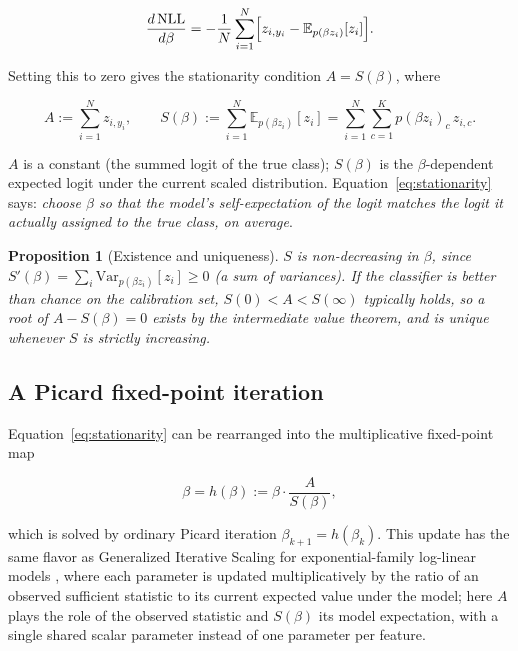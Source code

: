 \documentclass[11pt]{article}
\newtheorem{proposition}{Proposition}
\begin{document}
\begin{equation}
  \frac{d\,\mathrm{NLL}}{d\beta} = -\frac{1}{N}\sum_{i=1}^N
  \Bigl[z_{i,y_i} - \mathbb{E}_{p(\beta z_i)}[z_i]\Bigr].
\end{equation}

Setting this to zero gives the stationarity condition
$A = S(\beta)$, where

\begin{equation}
  A := \sum_{i=1}^N z_{i,y_i}, \qquad
  S(\beta) := \sum_{i=1}^N \mathbb{E}_{p(\beta z_i)}[z_i]
            = \sum_{i=1}^N \sum_{c=1}^K p(\beta z_i)_c\, z_{i,c}.
  \label{eq:stationarity}
\end{equation}

$A$ is a constant (the summed logit of the true class); $S(\beta)$ is
the $\beta$-dependent expected logit under the current scaled
distribution. Equation~\eqref{eq:stationarity} says: \emph{choose
$\beta$ so that the model's self-expectation of the logit matches the
logit it actually assigned to the true class, on average}.

\begin{proposition}[Existence and uniqueness]
$S$ is non-decreasing in $\beta$, since $S'(\beta) =
\sum_i \mathrm{Var}_{p(\beta z_i)}[z_i] \geq 0$ (a sum of variances). If the classifier is better than chance on the
calibration set, $S(0) < A < S(\infty)$ typically holds, so a root of
$A - S(\beta) = 0$ exists by the intermediate value theorem, and is
unique whenever $S$ is strictly increasing.
\end{proposition}

\subsection{A Picard fixed-point iteration}

Equation~\eqref{eq:stationarity} can be rearranged into the
multiplicative fixed-point map

\begin{equation}
  \beta = h(\beta) := \beta \cdot \frac{A}{S(\beta)},
  \label{eq:fixedpoint}
\end{equation}

which is solved by ordinary Picard iteration $\beta_{k+1} = h(\beta_k)$.
This update has the same flavor as Generalized Iterative Scaling for
exponential-family log-linear models \citep{darroch1972generalized},
where each parameter is updated multiplicatively by the ratio of an
observed sufficient statistic to its current expected value under the
model; here $A$ plays the role of the observed statistic and
$S(\beta)$ its model expectation, with a single shared scalar
parameter instead of one parameter per feature.
\end{document}
